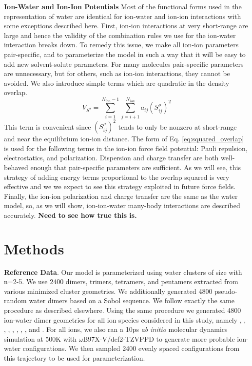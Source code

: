 \documentclass[journal=jctcce,manuscript=article]{achemso}
\begin{document}
\textbf{Ion-Water and Ion-Ion Potentials}
Most of the functional forms used in the representation of water are identical for ion-water and ion-ion interactions with some exceptions described here. First, ion-ion interactions at very short-range are large and hence the validity of the combination rules we use for the ion-water interaction breaks down. To remedy this issue, we make all ion-ion parameters pair-specific, and to parameterize the model in such a way that it will be easy to add new solvent-solute parameters. For many molecules pair-specific parameters are unnecessary, but for others, such as ion-ion interactions, they cannot be avoided. We also introduce simple terms which are quadratic in the density overlap.
\begin{equation}  V_{S^2}=\sum_{i=1}^{N_{ion}-1}\sum_{j=i+1}^{N_{ion}}a_{ij}(S_{ij}^\rho)^2
  \label{eq:squared_overlap}
\end{equation}
\noindent
This term is convenient since $(S_{ij}^\rho)^2$ tends to only be nonzero at short-range and near the equilibrium ion-ion distance. The form of Eq. \ref{eq:squared_overlap} is used for the following terms in the ion-ion force field potential: Pauli repulsion, electrostatics, and polarization. Dispersion and charge transfer are both well-behaved enough that pair-specific parameters are sufficient. As we will see, this strategy of adding energy terms proportional to the overlap squared is very effective and we we expect to see this strategy exploited in future force fields. Finally, the ion-ion polarization and charge transfer are the same as the water model, so, as we will show, ion-ion-water many-body interactions are described accurately. \textbf{Need to see how true this is.}

\section*{Methods}
\textbf{Reference Data}. Our model is parameterized using water clusters of size  with n=2-5. We use 2400 dimers, trimers, tetramers, and pentamers extracted from various minimized cluster geometries. We additionally generated 4800 pseudo-random water dimers based on a Sobol sequence. We follow exactly the same procedure as described elsewhere.\cite{misquitta2008first} Using the same procedure we generated 4800 ion-water dimer geometries for all ion species considered in this study, namely , , , , , , , , and . For all ions, we also ran a 10ps \textit{ab initio} molecular dynamics simulation at 500K with $\omega$B97X-V/def2-TZVPPD to generate more probable ion-water configurations. We then sampled 2400 evenly spaced configurations from this trajectory to be used for parameterization.
\end{document}
